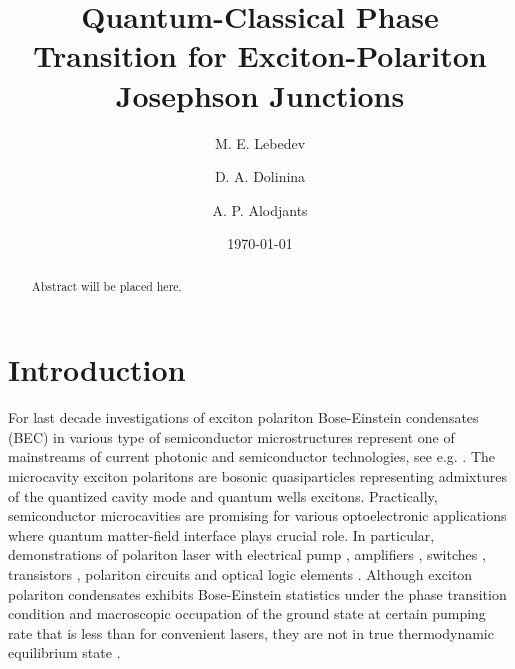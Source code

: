 \documentclass[aps, pre, preprint, groupedaddress, superscriptaddress, showkeys, showpacs] {revtex4-1}
\begin{document}
\title{Quantum-Classical Phase Transition for Exciton-Polariton Josephson Junctions}

\author{M. E. Lebedev}

\author{D. A. Dolinina}

\author{A. P. Alodjants}

\date{\today}

\begin{abstract}
Abstract will be placed here.
\end{abstract}

\pacs{\dots}
\keywords{\dots}

\maketitle

\newcommand{\sn}{\textrm{sn}}
\newcommand{\cn}{\textrm{cn}}
\newcommand{\dn}{\textrm{dn}}
\newcommand{\sd}{\textrm{sd}}
\newcommand{\cd}{\textrm{cd}}
\newcommand{\nd}{\textrm{nd}}
\newcommand{\am}{\textrm{am}}

\newcommand{\red}{\color{red}}

\section{Introduction \label{sec:introduction}}

For last decade investigations of exciton polariton Bose-Einstein condensates (BEC) in various type of semiconductor microstructures represent one of mainstreams of current photonic and semiconductor technologies, see e.g. \cite{Sanvitto,Guillet}.
The microcavity exciton polaritons are bosonic quasiparticles representing  admixtures of the quantized cavity mode and quantum wells excitons.
Practically, semiconductor microcavities are promising for various optoelectronic applications where quantum  matter-field interface plays crucial role.
In particular, demonstrations of polariton laser with electrical pump \cite{Bhattacharya,Schneider}, amplifiers \cite{Niemietz}, switches \cite{Amo_2010}, transistors \cite{Ballarini}, polariton circuits and optical logic elements \cite{Sturm,Liew}.
Although exciton polariton condensates exhibits Bose-Einstein statistics under the phase transition condition and macroscopic occupation of the ground state at certain pumping rate that is less than for convenient lasers, they are not in true thermodynamic equilibrium state \cite{Byrnes_2014,Sun}.
  
\end{document}
